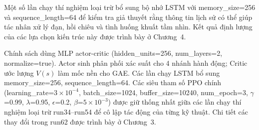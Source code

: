 Một số lần chạy thí nghiệm loại trừ bổ sung bộ nhớ LSTM với memory\_size=256 và sequence\_length=64 để kiểm tra giả thuyết rằng thông tin lịch sử có thể giúp tác nhân xử lý đạn, hồi chiêu và tình huống khuất tầm nhìn. Kết quả định lượng của các lựa chọn kiến trúc này được trình bày ở Chương~4.

Chính sách dùng MLP actor-critic (hidden\_units=256, num\_layers=2, normalize=true). Actor sinh phân phối xác suất cho 4 nhánh hành động; Critic ước lượng $V(s)$ làm mốc nền cho GAE. Các lần chạy LSTM bổ sung memory\_size=256, sequence\_length=64. Các siêu tham số PPO chính (learning\_rate=$3\times10^{-4}$, batch\_size=1024, buffer\_size=10240, num\_epoch=3, $\gamma$=0.99, $\lambda$=0.95, $\epsilon$=0.2, $\beta$=$5\times10^{-3}$) được giữ thống nhất giữa các lần chạy thí nghiệm loại trừ run34--run54 để cô lập tác động của từng kỹ thuật. Chi tiết các thay đổi trong run62 được trình bày ở Chương~3.
